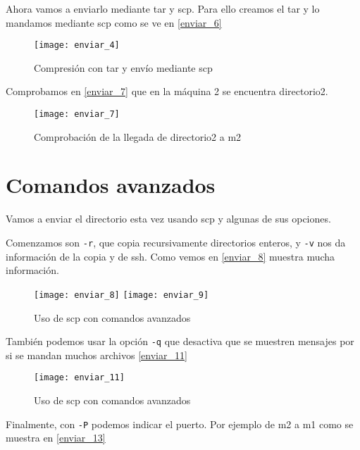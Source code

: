 Ahora vamos a enviarlo mediante tar y scp. Para ello creamos el tar y lo mandamos mediante scp como se ve en \eqref{enviar_6}

\begin{figure}
\begin{center}
\caption{Compresión con tar y envío mediante scp}
\label{enviar_6}
\texttt{[image: enviar\_4]}
\end{center}
\end{figure}

Comprobamos en \eqref{enviar_7} que en la máquina 2 se encuentra directorio2.

\begin{figure}
\begin{center}
\caption{Comprobación de la llegada de directorio2 a m2}
\label{enviar_7}
\texttt{[image: enviar\_7]}
\end{center}
\end{figure}

\section{Comandos avanzados}

Vamos a enviar el directorio esta vez usando scp y algunas de sus opciones.

Comenzamos son \verb|-r|, que copia recursivamente directorios enteros, y \verb|-v| nos da información de la copia y de ssh. Como vemos en \eqref{enviar_8} muestra mucha información.

\begin{figure}
\begin{center}
\caption{Uso de scp con comandos avanzados}
\label{enviar_8}
\texttt{[image: enviar\_8]}
\texttt{[image: enviar\_9]}
\end{center}
\end{figure}

También podemos usar la opción \verb|-q| que desactiva que se muestren mensajes por si se mandan muchos archivos \eqref{enviar_11}

\begin{figure}
\begin{center}
\caption{Uso de scp con comandos avanzados}
\label{enviar_11}
\texttt{[image: enviar\_11]}
\end{center}
\end{figure}

Finalmente, con \verb|-P| podemos indicar el puerto. Por ejemplo de m2 a m1 como se muestra en \eqref{enviar_13}

